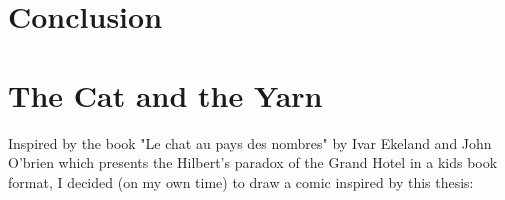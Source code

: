 \clearemptydoublepage
\backmatter

\chapter*{Conclusion}

\newpage
\chapter*{The Cat and the Yarn}

Inspired by the book "Le chat au pays des nombres" by Ivar Ekeland and John O'brien which presents the Hilbert's paradox of the Grand Hotel in a kids book format, I decided (on my own time) to draw a comic inspired by this thesis:
\vfill
\begin{center}
\end{center}
\vfill
